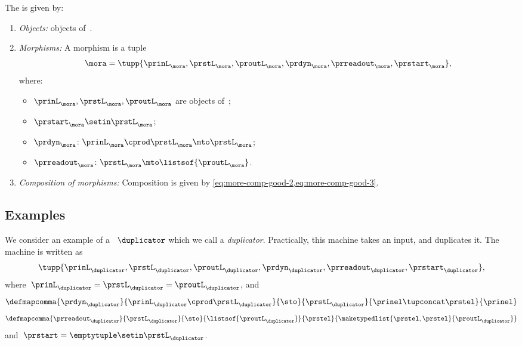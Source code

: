 \begin{definition}[\More]
    \label{def:More}
    The  \More is given by:
    \begin{enumerate}
        \item \emph{Objects:} objects of~\SetL.
        \item \emph{Morphisms:}
              A morphism is a tuple
              \begin{equation}
                  \mora = \tupp{\prinL_{\mora},\prstL_{\mora}, \proutL_{\mora},\prdyn_{\mora},\prreadout_{\mora},\prstart_{\mora}},
              \end{equation}
              where:
              \begin{itemize}
                  \item $\prinL_{\mora},\prstL_{\mora}, \proutL_{\mora}$ are objects of~\SetL;
                  \item $\prstart_{\mora} \setin \prstL_{\mora}$;
                  \item $ \prdyn_{\mora} \colon \prinL_{\mora} \cprod \prstL_{\mora} \mto \prstL_{\mora}$;
                  \item $ \prreadout_{\mora} \colon \prstL_{\mora} \mto \listsof{\proutL_{\mora}}$.
              \end{itemize}
        \item \emph{Composition of morphisms:}
              Composition is given by \cref{eq:more-comp-good-2,eq:more-comp-good-3}.
    \end{enumerate}
\end{definition}

\subsection{Examples}

\begin{example}[Duplicator]
    We consider an example of a ~$\duplicator$ which we call a \emph{duplicator}.
    Practically, this machine takes an input, and duplicates it.
    The machine is written as
    \begin{equation}
        \tupp{\prinL_{\duplicator},\prstL_{\duplicator},\proutL_{\duplicator},\prdyn_{\duplicator},\prreadout_{\duplicator},\prstart_{\duplicator}},
    \end{equation}
    where~$\prinL_{\duplicator}=\prstL_{\duplicator}=\proutL_\duplicator$, and
    \begin{equation}
        \defmapcomma{\prdyn_\duplicator}
        {\prinL_\duplicator \cprod \prstL_\duplicator}
        {\sto}
        {\prstL_\duplicator}
        {\prinel \tupconcat \prstel}
        {\prinel}
    \end{equation}
    \begin{equation}
        \defmapcomma{\prreadout_\duplicator}
        {\prstL_\duplicator}
        {\sto}
        {\listsof{\proutL_\duplicator}}
        {\prstel}
        {\maketypedlist{\prstel,\prstel}{\proutL_\duplicator}}
    \end{equation}
    and~$\prstart=\emptytuple \setin \prstL_\duplicator$.
\end{example}

